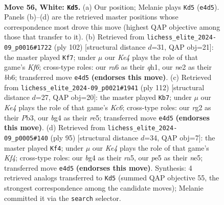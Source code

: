 \documentclass[11pt]{article}
\begin{document}
\clearpage

\begin{figure}[p]\centering
\begin{subfigure}{0.46\textwidth}\centering
\resizebox{\linewidth}{!}{%
\newchessgame
\chessboard[
  setfen={8/7p/r4k2/4p3/1p2K1b1/8/4n1r1/8 w - - 2 56},
  showmover=false,
  pgfstyle=straightmove, color=movearrow, markmove={e4-d5}
]}
\caption{}
\end{subfigure}\hfill
\begin{subfigure}{0.46\textwidth}\centering
\resizebox{\linewidth}{!}{%
\newchessgame
\chessboard[
  setfen={8/p6k/1b3Kp1/8/8/1r6/8/7q w - - 0 52},
  showmover=false,
  pgfstyle=straightmove, color=movearrow, markmove={f6-f7}
]}
\caption{}
\end{subfigure}
\\[4pt]
\begin{subfigure}{0.46\textwidth}\centering
\resizebox{\linewidth}{!}{%
\newchessgame
\chessboard[
  setfen={8/p1p1k3/2K1n3/4r3/8/1P6/8/8 w - - 0 57},
  showmover=false,
  pgfstyle=straightmove, color=movearrow, markmove={c6-b7}
]}
\caption{}
\end{subfigure}\hfill
\begin{subfigure}{0.46\textwidth}\centering
\resizebox{\linewidth}{!}{%
\newchessgame
\chessboard[
  setfen={8/8/8/R3Nk1p/3P3P/2n5/3N1P2/5K2 b - - 0 48},
  showmover=false,
  pgfstyle=straightmove, color=movearrow, markmove={f5-f4}
]}
\caption{}
\end{subfigure}
\caption{\textbf{Move 56, White: \texttt{Kd5}.} (a) Our position; Melanie plays \texttt{Kd5} (\texttt{e4d5}). Panels (b)--(d) are the retrieved master positions whose correspondence most drove this move (highest QAP objective among those that transfer to it). (b) Retrieved from \texttt{lichess\_elite\_2024-09\_p0016\#1722} (ply 102) [structural distance $d$=31, QAP obj=21]: the master played \texttt{Kf7}; under $\mu$ our \emph{Ke4} plays the role of that game's \emph{Kf6}; cross-type roles: our \emph{r}a6 as their \emph{q}h1, our \emph{n}e2 as their \emph{b}b6; transferred move \texttt{e4d5} \textbf{(endorses this move)}. (c) Retrieved from \texttt{lichess\_elite\_2024-09\_p0021\#1941} (ply 112) [structural distance $d$=27, QAP obj=20]: the master played \texttt{Kb7}; under $\mu$ our \emph{Ke4} plays the role of that game's \emph{Kc6}; cross-type roles: our \emph{r}g2 as their \emph{P}b3, our \emph{b}g4 as their \emph{r}e5; transferred move \texttt{e4d5} \textbf{(endorses this move)}. (d) Retrieved from \texttt{lichess\_elite\_2024-09\_p0005\#140} (ply 95) [structural distance $d$=34, QAP obj=7]: the master played \texttt{Kf4}; under $\mu$ our \emph{Ke4} plays the role of that game's \emph{Kf4}; cross-type roles: our \emph{b}g4 as their \emph{r}a5, our \emph{p}e5 as their \emph{n}e5; transferred move \texttt{e4d5} \textbf{(endorses this move)}. Synthesis: 4 retrieved analogs transferred to \texttt{Kd5} (summed QAP objective 55, the strongest correspondence among the candidate moves); Melanie committed it via the \texttt{search} selector.}
\label{fig:thought-m110}
\end{figure}
\end{document}
